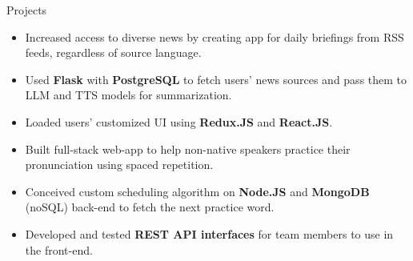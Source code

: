 \documentclass{resume} %
\begin{document}
\begin{workSection}{Projects}
	\customItem[
	title=\href{https://github.com/AshkanArabim/news-briefer}{News Bridge (BorderHack 2024 submission) \faExternalLink},
	duration=Team of 4 | September 2024,
	]
	\begin{itemize}
		\vspace{-0.5em}
		\itemsep -6pt {}
		\item Increased access to diverse news by creating app for daily briefings from RSS feeds, regardless of source language.
		\item Used \textbf{Flask} with \textbf{PostgreSQL} to fetch users' news sources and pass them to LLM and TTS models for summarization.
		\item Loaded users' customized UI using \textbf{Redux.JS} and \textbf{React.JS}.
	\end{itemize}
	
	
	\customItem[
	title=\href{https://devpost.com/software/vocowbulary-courses}{Vocabulary Courses (HackWesTX 2024 submission) \faExternalLink},
	duration=Team of 4 | September 2024,
	]
	\begin{itemize}
		\vspace{-0.5em}
		\itemsep -6pt {}
		\item Built full-stack web-app to help non-native speakers practice their pronunciation using spaced repetition. %
		\item Conceived custom scheduling algorithm on \textbf{Node.JS} and \textbf{MongoDB} (noSQL) back-end to fetch the next practice word.
		\item Developed and tested \textbf{REST API interfaces} for team members to use in the front-end.
	\end{itemize}
	
	

\end{workSection}
\end{document}

